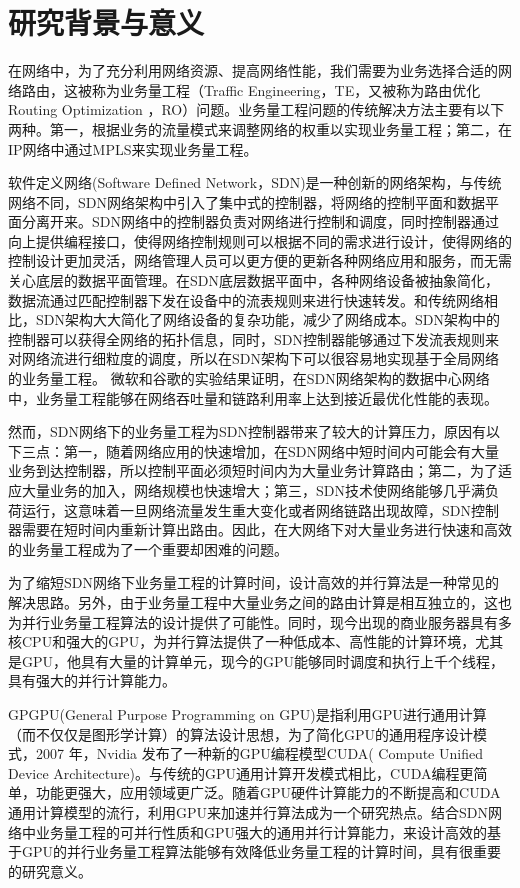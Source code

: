\documentclass[master]{thesis-uestc}
\begin{document}
\thesistableofcontents
\thesischapterexordium
\section{研究背景与意义}

在网络中，为了充分利用网络资源、提高网络性能，我们需要为业务选择合适的网络路由，这被称为业务量工程（Traffic Engineering，TE，又被称为路由优化 Routing Optimization ，RO）问题。业务量工程问题的传统解决方法主要有以下两种。第一，根据业务的流量模式来调整网络的权重以实现业务量工程；第二，在IP网络中通过MPLS来实现业务量工程。

软件定义网络(Software Defined Network，SDN)是一种创新的网络架构，与传统网络不同，SDN网络架构中引入了集中式的控制器，将网络的控制平面和数据平面分离开来。SDN网络中的控制器负责对网络进行控制和调度，同时控制器通过向上提供编程接口，使得网络控制规则可以根据不同的需求进行设计，使得网络的控制设计更加灵活，网络管理人员可以更方便的更新各种网络应用和服务，而无需关心底层的数据平面管理。在SDN底层数据平面中，各种网络设备被抽象简化，数据流通过匹配控制器下发在设备中的流表规则来进行快速转发。和传统网络相比，SDN架构大大简化了网络设备的复杂功能，减少了网络成本。SDN架构中的控制器可以获得全网络的拓扑信息，同时，SDN控制器能够通过下发流表规则来对网络流进行细粒度的调度，所以在SDN架构下可以很容易地实现基于全局网络的业务量工程。
微软和谷歌的实验结果证明，在SDN网络架构的数据中心网络中，业务量工程能够在网络吞吐量和链路利用率上达到接近最优化性能的表现。

然而，SDN网络下的业务量工程为SDN控制器带来了较大的计算压力，原因有以下三点：第一，随着网络应用的快速增加，在SDN网络中短时间内可能会有大量业务到达控制器，所以控制平面必须短时间内为大量业务计算路由；第二，为了适应大量业务的加入，网络规模也快速增大；第三，SDN技术使网络能够几乎满负荷运行，这意味着一旦网络流量发生重大变化或者网络链路出现故障，SDN控制器需要在短时间内重新计算出路由。因此，在大网络下对大量业务进行快速和高效的业务量工程成为了一个重要却困难的问题。

为了缩短SDN网络下业务量工程的计算时间，设计高效的并行算法是一种常见的解决思路。另外，由于业务量工程中大量业务之间的路由计算是相互独立的，这也为并行业务量工程算法的设计提供了可能性。同时，现今出现的商业服务器具有多核CPU和强大的GPU，为并行算法提供了一种低成本、高性能的计算环境，尤其是GPU，他具有大量的计算单元，现今的GPU能够同时调度和执行上千个线程，具有强大的并行计算能力。

GPGPU(General Purpose Programming on GPU)是指利用GPU进行通用计算（而不仅仅是图形学计算）的算法设计思想，为了简化GPU的通用程序设计模式，2007 年，Nvidia 发布了一种新的GPU编程模型CUDA( Compute Unified Device Architecture)。与传统的GPU通用计算开发模式相比，CUDA编程更简单，功能更强大，应用领域更广泛。随着GPU硬件计算能力的不断提高和CUDA通用计算模型的流行，利用GPU来加速并行算法成为一个研究热点。结合SDN网络中业务量工程的可并行性质和GPU强大的通用并行计算能力，来设计高效的基于GPU的并行业务量工程算法能够有效降低业务量工程的计算时间，具有很重要的研究意义。
\end{document}

